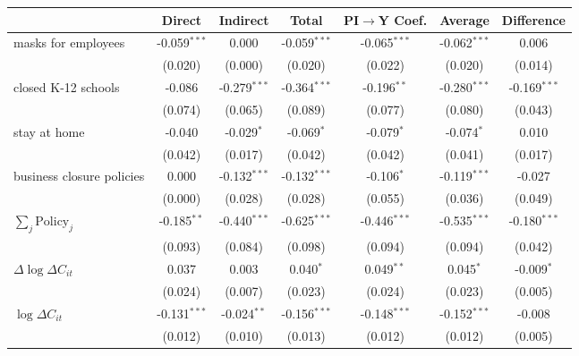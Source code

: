 
\begin{tabular}{lccccc|>{}c}
\toprule
  & Direct & Indirect & Total & PI$\to$Y Coef. & Average & Difference\\
\midrule
masks for employees & -0.059$^{***}$ & 0.000 & -0.059$^{***}$ & -0.065$^{***}$ & -0.062$^{***}$ & 0.006\\
 & (0.020) & (0.000) & (0.020) & (0.022) & (0.020) & (0.014)\\
closed K-12 schools & -0.086 & -0.279$^{***}$ & -0.364$^{***}$ & -0.196$^{**}$ & -0.280$^{***}$ & -0.169$^{***}$\\
 & (0.074) & (0.065) & (0.089) & (0.077) & (0.080) & (0.043)\\
stay at home & -0.040 & -0.029$^{*}$ & -0.069$^{*}$ & -0.079$^{*}$ & -0.074$^{*}$ & 0.010\\
 & (0.042) & (0.017) & (0.042) & (0.042) & (0.041) & (0.017)\\
business closure policies & 0.000 & -0.132$^{***}$ & -0.132$^{***}$ & -0.106$^{*}$ & -0.119$^{***}$ & -0.027\\
 & (0.000) & (0.028) & (0.028) & (0.055) & (0.036) & (0.049)\\
$\sum_j \mathrm{Policy}_j$ & -0.185$^{**}$ & -0.440$^{***}$ & -0.625$^{***}$ & -0.446$^{***}$ & -0.535$^{***}$ & -0.180$^{***}$\\
 & (0.093) & (0.084) & (0.098) & (0.094) & (0.094) & (0.042)\\
$\Delta \log \Delta C_{it}$ & 0.037 & 0.003 & 0.040$^{*}$ & 0.049$^{**}$ & 0.045$^{*}$ & -0.009$^{*}$\\
 & (0.024) & (0.007) & (0.023) & (0.024) & (0.023) & (0.005)\\
$\log \Delta C_{it}$ & -0.131$^{***}$ & -0.024$^{**}$ & -0.156$^{***}$ & -0.148$^{***}$ & -0.152$^{***}$ & -0.008\\
 & (0.012) & (0.010) & (0.013) & (0.012) & (0.012) & (0.005)\\
\bottomrule
\end{tabular}